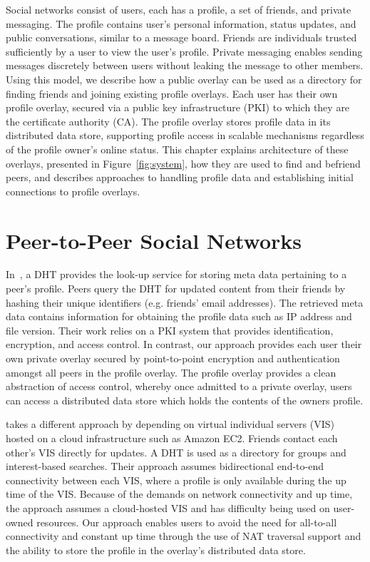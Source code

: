 Social networks consist of users, each has a profile, a set of friends, and
private messaging.  The profile contains user's personal information, status
updates, and public conversations, similar to a message board.  Friends are
individuals trusted sufficiently by a user to view the user's profile.  Private
messaging enables sending messages discretely between users without leaking the
message to other members.  Using this model, we describe how a public overlay
can be used as a directory for finding friends and joining existing profile
overlays.  Each user has their own profile overlay, secured via a public key
infrastructure (PKI) to which they are the certificate authority (CA).  The
profile overlay stores profile data in its distributed data store, supporting
profile access in scalable mechanisms regardless of the profile owner's online
status.  This chapter explains architecture of these overlays, presented in
Figure~\ref{fig:system}, how they are used to find and befriend peers, and
describes approaches to handling profile data and establishing initial
connections to profile overlays.

\section{Peer-to-Peer Social Networks}
In~\cite{peerson}, a DHT provides the look-up service for storing meta data
pertaining to a peer's profile. Peers query the DHT for updated content from 
their friends by hashing their unique identifiers (e.g. friends' email
addresses).  The retrieved meta data contains information for obtaining the
profile data such as IP address and file version. Their work relies
on a PKI system that provides identification, encryption, and access control.
In contrast, our approach provides each user their own private overlay secured
by point-to-point encryption and authentication amongst all peers in the profile
overlay.  The profile overlay provides a clean abstraction of access control,
whereby once admitted to a private overlay, users can access a distributed data
store which holds the contents of the owners profile.

\cite{vis-a-vis} takes a different approach by depending on virtual individual
servers (VIS) hosted on a cloud infrastructure such as Amazon EC2. Friends
contact each other's VIS directly for updates.  A DHT is used as a directory for
groups and interest-based searches. Their approach assumes bidirectional
end-to-end connectivity between each VIS, where a profile is only available
during the up time of the VIS.  Because of the demands on network connectivity
and up time, the approach assumes a cloud-hosted VIS and has difficulty being used on user-owned resources.
Our approach enables users to avoid the need for all-to-all connectivity and
constant up time through the use of NAT traversal support and the
ability to store the profile in the overlay's distributed data store.

